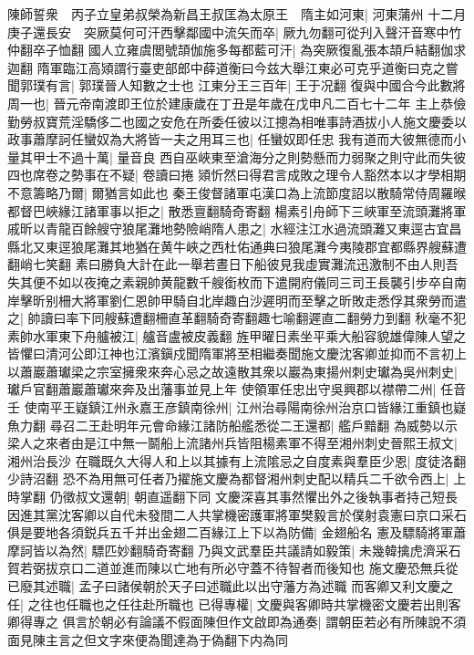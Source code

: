 陳師誓衆　丙子立皇弟叔榮為新昌王叔匡為太原王　隋主如河東|{
	河東蒲州}
十二月庚子還長安　突厥莫何可汗西擊鄰國中流矢而卒|{
	厥九勿翻可從刋入聲汗音寒中竹仲翻卒子恤翻}
國人立雍虞閭號頡伽施多每都藍可汗|{
	為突厥復亂張本頡戶結翻伽求迦翻}
隋軍臨江高熲謂行臺吏部郎中薛道衡曰今兹大舉江東必可克乎道衡曰克之嘗聞郭璞有言|{
	郭璞晉人知數之士也}
江東分王三百年|{
	王于况翻}
復與中國合今此數將周一也|{
	晉元帝南渡即王位於建康歲在丁丑是年歲在戊申凡二百七十二年}
主上恭儉勤勞叔寶荒淫驕侈二也國之安危在所委任彼以江摠為相唯事詩酒拔小人施文慶委以政事蕭摩訶任蠻奴為大將皆一夫之用耳三也|{
	任蠻奴即任忠}
我有道而大彼無德而小量其甲士不過十萬|{
	量音良}
西自巫峽東至滄海分之則勢懸而力弱聚之則守此而失彼四也席卷之勢事在不疑|{
	卷讀曰捲}
熲忻然曰得君言成敗之理令人豁然本以才學相期不意籌略乃爾|{
	爾猶言如此也}
秦王俊督諸軍屯漢口為上流節度詔以散騎常侍周羅㬋都督巴峽緣江諸軍事以拒之|{
	散悉亶翻騎奇寄翻}
楊素引舟師下三峽軍至流頭灘將軍戚昕以青龍百餘艘守狼尾灘地勢險峭隋人患之|{
	水經注江水過流頭灘又東逕古宜昌縣北又東逕狼尾灘其地猶在黄牛峽之西杜佑通典曰狼尾灘今夷陵郡宜都縣界艘蘇遭翻峭七笑翻}
素曰勝負大計在此一舉若晝日下船彼見我虛實灘流迅激制不由人則吾失其便不如以夜掩之素親帥黄龍數千艘銜枚而下遣開府儀同三司王長襲引步卒自南岸擊昕别柵大將軍劉仁恩帥甲騎自北岸趣白沙遲明而至擊之昕敗走悉俘其衆勞而遣之|{
	帥讀曰率下同艘蘇遭翻柵直革翻騎奇寄翻趣七喻翻遲直二翻勞力到翻}
秋毫不犯素帥水軍東下舟艫被江|{
	艫音盧被皮義翻}
旌甲曜日素坐平乘大船容貌雄偉陳人望之皆懼曰清河公即江神也江濱鎭戍聞隋軍將至相繼奏聞施文慶沈客卿並抑而不言初上以蕭巖蕭瓛梁之宗室擁衆來奔心忌之故遠散其衆以巖為東揚州刺史瓛為吳州刺史|{
	瓛戶官翻蕭巖蕭瓛來奔及出藩事並見上年}
使領軍任忠出守吳興郡以襟帶二州|{
	任音壬}
使南平王嶷鎮江州永嘉王彦鎮南徐州|{
	江州治尋陽南徐州治京口皆緣江重鎮也嶷魚力翻}
尋召二王赴明年元會命緣江諸防船艦悉從二王還都|{
	艦戶黯翻}
為威勢以示梁人之來者由是江中無一鬬船上流諸州兵皆阻楊素軍不得至湘州刺史晉熙王叔文|{
	湘州治長沙}
在職既久大得人和上以其據有上流隂忌之自度素與羣臣少恩|{
	度徒洛翻少詩沼翻}
恐不為用無可任者乃擢施文慶為都督湘州刺史配以精兵二千欲令西上|{
	上時掌翻}
仍徵叔文還朝|{
	朝直遥翻下同}
文慶深喜其事然懼出外之後執事者持己短長因進其黨沈客卿以自代未發間二人共掌機密護軍將軍樊毅言於僕射袁憲曰京口采石俱是要地各須鋭兵五千并出金翅二百緣江上下以為防備|{
	金翅船名}
憲及驃騎將軍蕭摩訶皆以為然|{
	驃匹妙翻騎奇寄翻}
乃與文武羣臣共議請如毅策|{
	未幾韓擒虎濟采石賀若弼拔京口二道並進而陳以亡地有所必守蓋不待智者而後知也}
施文慶恐無兵從已廢其述職|{
	孟子曰諸侯朝於天子曰述職此以出守藩方為述職}
而客卿又利文慶之任|{
	之往也任職也之任往赴所職也}
已得專權|{
	文慶與客卿時共掌機密文慶若出則客卿得專之}
俱言於朝必有論議不假面陳但作文啟即為通奏|{
	謂朝臣若必有所陳說不須面見陳主言之但文字來便為聞達為于偽翻下内為同}
